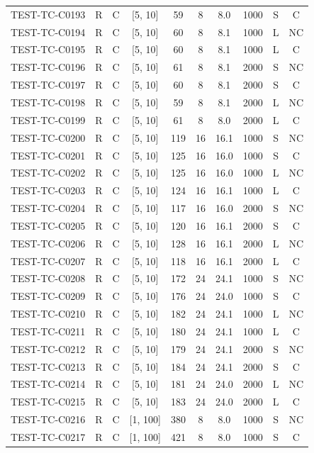 \begin{longtable}{lccccccccc}
TEST-TC-C0193 & R & C & [5, 10] & 59 & 8 & 8.0 & 1000 & S & C \\
TEST-TC-C0194 & R & C & [5, 10] & 60 & 8 & 8.1 & 1000 & L & NC \\
TEST-TC-C0195 & R & C & [5, 10] & 60 & 8 & 8.1 & 1000 & L & C \\
TEST-TC-C0196 & R & C & [5, 10] & 61 & 8 & 8.1 & 2000 & S & NC \\
TEST-TC-C0197 & R & C & [5, 10] & 60 & 8 & 8.1 & 2000 & S & C \\
TEST-TC-C0198 & R & C & [5, 10] & 59 & 8 & 8.1 & 2000 & L & NC \\
TEST-TC-C0199 & R & C & [5, 10] & 61 & 8 & 8.0 & 2000 & L & C \\
TEST-TC-C0200 & R & C & [5, 10] & 119 & 16 & 16.1 & 1000 & S & NC \\
TEST-TC-C0201 & R & C & [5, 10] & 125 & 16 & 16.0 & 1000 & S & C \\
TEST-TC-C0202 & R & C & [5, 10] & 125 & 16 & 16.0 & 1000 & L & NC \\
TEST-TC-C0203 & R & C & [5, 10] & 124 & 16 & 16.1 & 1000 & L & C \\
TEST-TC-C0204 & R & C & [5, 10] & 117 & 16 & 16.0 & 2000 & S & NC \\
TEST-TC-C0205 & R & C & [5, 10] & 120 & 16 & 16.1 & 2000 & S & C \\
TEST-TC-C0206 & R & C & [5, 10] & 128 & 16 & 16.1 & 2000 & L & NC \\
TEST-TC-C0207 & R & C & [5, 10] & 118 & 16 & 16.1 & 2000 & L & C \\
TEST-TC-C0208 & R & C & [5, 10] & 172 & 24 & 24.1 & 1000 & S & NC \\
TEST-TC-C0209 & R & C & [5, 10] & 176 & 24 & 24.0 & 1000 & S & C \\
TEST-TC-C0210 & R & C & [5, 10] & 182 & 24 & 24.1 & 1000 & L & NC \\
TEST-TC-C0211 & R & C & [5, 10] & 180 & 24 & 24.1 & 1000 & L & C \\
TEST-TC-C0212 & R & C & [5, 10] & 179 & 24 & 24.1 & 2000 & S & NC \\
TEST-TC-C0213 & R & C & [5, 10] & 184 & 24 & 24.1 & 2000 & S & C \\
TEST-TC-C0214 & R & C & [5, 10] & 181 & 24 & 24.0 & 2000 & L & NC \\
TEST-TC-C0215 & R & C & [5, 10] & 183 & 24 & 24.0 & 2000 & L & C \\
TEST-TC-C0216 & R & C & [1, 100] & 380 & 8 & 8.0 & 1000 & S & NC \\
TEST-TC-C0217 & R & C & [1, 100] & 421 & 8 & 8.0 & 1000 & S & C \\

\end{longtable}
